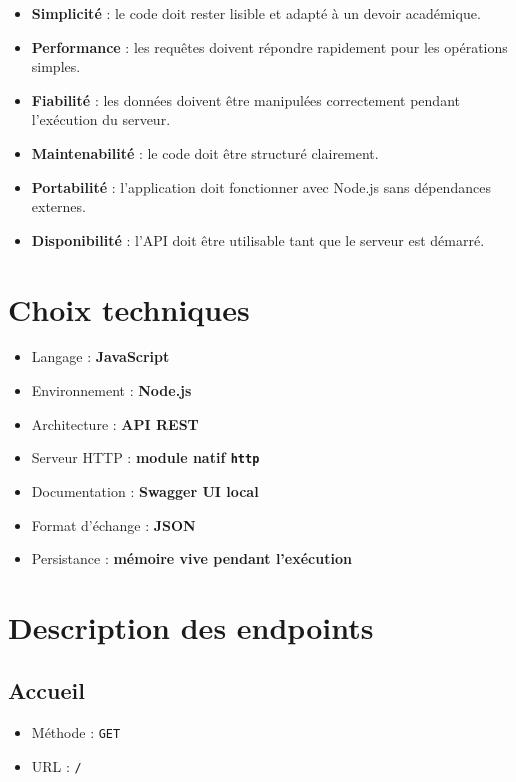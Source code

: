 \documentclass[12pt,a4paper]{article}
\begin{document}
\begin{itemize}
    \item \textbf{Simplicité} : le code doit rester lisible et adapté à un devoir académique.
    \item \textbf{Performance} : les requêtes doivent répondre rapidement pour les opérations simples.
    \item \textbf{Fiabilité} : les données doivent être manipulées correctement pendant l'exécution du serveur.
    \item \textbf{Maintenabilité} : le code doit être structuré clairement.
    \item \textbf{Portabilité} : l'application doit fonctionner avec Node.js sans dépendances externes.
    \item \textbf{Disponibilité} : l'API doit être utilisable tant que le serveur est démarré.
\end{itemize}

\section{Choix techniques}

\begin{itemize}
    \item Langage : \textbf{JavaScript}
    \item Environnement : \textbf{Node.js}
    \item Architecture : \textbf{API REST}
    \item Serveur HTTP : \textbf{module natif \texttt{http}}
    \item Documentation : \textbf{Swagger UI local}
    \item Format d'échange : \textbf{JSON}
    \item Persistance : \textbf{mémoire vive pendant l'exécution}
\end{itemize}

\section{Description des endpoints}

\subsection{Accueil}

\begin{itemize}
    \item Méthode : \texttt{GET}
    \item URL : \texttt{/}
\end{itemize}
\end{document}
